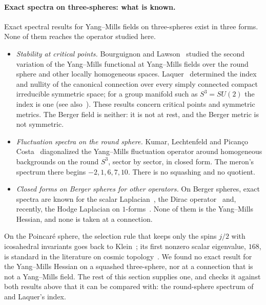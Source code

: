 \documentclass[11pt]{article}
\theoremstyle{definition}
\theoremstyle{remark}
\begin{document}
\paragraph{Exact spectra on three-spheres: what is known.} Exact spectral results for Yang--Mills
fields on three-spheres exist in three forms. None of them reaches the operator studied here.
\begin{itemize}
  \item \emph{Stability at critical points.} Bourguignon and Lawson~\cite{bl1981} studied the second
    variation of the Yang--Mills functional at Yang--Mills fields over the round sphere and other locally
    homogeneous spaces. Laquer~\cite{laquer1984} determined the index and nullity of the canonical
    connection over every simply connected compact irreducible symmetric space; for a group manifold
    such as $S^3=SU(2)$ the index is one (see also~\cite{ohnitapan1989}). These results concern critical
    points and symmetric metrics. The Berger field is neither: it is not at rest, and the Berger metric
    is not symmetric.
  \item \emph{Fluctuation spectra on the round sphere.} Kumar, Lechtenfeld and Pican\c{c}o
    Costa~\cite{klc2021} diagonalized the Yang--Mills fluctuation operator around homogeneous
    backgrounds on the round $S^3$, sector by sector, in closed form. The meron's spectrum there begins
    $-2,1,6,7,10$. There is no squashing and no quotient.
  \item \emph{Closed forms on Berger spheres for other operators.} On Berger spheres, exact spectra are
    known for the scalar Laplacian~\cite{lauret2019}, the Dirac operator~\cite{bar1992,klingschueth2022}
    and, recently, the Hodge Laplacian on $1$-forms~\cite{henkellauret2026}. None of them is the
    Yang--Mills Hessian, and none is taken at a connection.
\end{itemize}
On the Poincar\'e sphere, the selection rule that keeps only the spins $j/2$ with icosahedral invariants
goes back to Klein~\cite{klein1884}; its first nonzero scalar eigenvalue, $168$, is standard in the
literature on cosmic topology~\cite{lachiezerey2004}. We found no exact result for the Yang--Mills
Hessian on a squashed three-sphere, nor at a connection that is not a Yang--Mills field. The rest of
this section supplies one, and checks it against both results above that it can be compared with: the
round-sphere spectrum of~\cite{klc2021} and Laquer's index.
\end{document}
